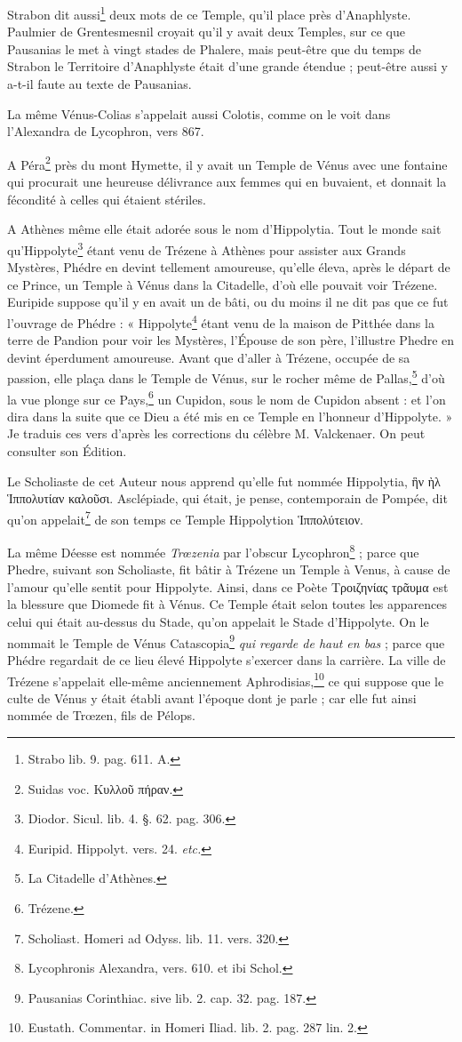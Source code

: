 \documentclass[a4paper, 11pt, oneside, polutonikogreek, french]{article}
\begin{document}
Strabon dit aussi\footnote{Strabo lib. 9. pag. 611. A.} deux mots de ce Temple, qu'il place près d'Anaphlyste. Paulmier de Grentesmesnil croyait qu'il y avait deux Temples, sur ce que Pausanias le met à vingt stades de Phalere, mais peut-être que du temps de Strabon le Territoire d'Anaphlyste était d'une grande étendue ; peut-être aussi y a-t-il faute au texte de Pausanias.

La même Vénus-Colias s'appelait aussi Colotis, comme on le voit dans l'Alexandra de Lycophron, vers 867.

A Péra\footnote{Suidas voc. Κυλλοῦ πήραν.} près du mont Hymette, il y avait un Temple de Vénus avec une fontaine qui procurait une heureuse délivrance aux femmes qui en buvaient, et donnait la fécondité à celles qui étaient stériles.

A Athènes même elle était adorée sous le nom d'Hippolytia. Tout le monde sait qu'Hippolyte\footnote{Diodor. Sicul. lib. 4. §. 62. pag. 306.} étant venu de Trézene à Athènes pour assister aux Grands Mystères, Phédre en devint tellement amoureuse, qu'elle éleva, après le départ de ce Prince, un Temple à Vénus dans la Citadelle, d'où elle pouvait voir Trézene. Euripide suppose qu'il y en avait un de bâti, ou du moins il ne dit pas que ce fut l'ouvrage de Phédre : « Hippolyte\footnote{Euripid. Hippolyt. vers. 24. \emph{etc.}} étant venu de la maison de Pitthée dans la terre de Pandion pour voir les Mystères, l'Épouse de son père, l'illustre Phedre en devint éperdument amoureuse. Avant que d'aller à Trézene, occupée de sa passion, elle plaça dans le Temple de Vénus, sur le rocher même de Pallas,\footnote{La Citadelle d'Athènes.} d'où la vue plonge sur ce Pays,\footnote{Trézene.} un Cupidon, sous le nom de Cupidon absent : et l'on dira dans la suite que ce Dieu a été mis en ce Temple en l'honneur d'Hippolyte. » Je traduis ces vers d'après les corrections du célèbre M. Valckenaer. On peut consulter son Édition.

Le Scholiaste de cet Auteur nous apprend qu'elle fut nommée Hippolytia, ἣν ὴλ Ἱππολυτίαν καλοῦσι. Asclépiade, qui était, je pense, contemporain de Pompée, dit qu'on appelait\footnote{Scholiast. Homeri ad Odyss. lib. 11. vers. 320.} de son temps ce Temple Hippolytion Ἱππολύτειον.

La même Déesse est nommée \emph{Trœzenia} par l'obscur Lycophron\footnote{Lycophronis Alexandra, vers. 610. et ibi Schol.} ; parce que Phedre, suivant son Scholiaste, fit bâtir à Trézene un Temple à Venus, à cause de l'amour qu'elle sentit pour Hippolyte. Ainsi, dans ce Poète Τροιζηνίας τρᾶυμα est la blessure que Diomede fit à Vénus. Ce Temple était selon toutes les apparences celui qui était au-dessus du Stade, qu'on appelait le Stade d'Hippolyte. On le nommait le Temple de Vénus Catascopia\footnote{Pausanias Corinthiac. sive lib. 2. cap. 32. pag. 187.} \emph{qui regarde de haut en bas} ; parce que Phédre regardait de ce lieu élevé Hippolyte s'exercer dans la carrière. La ville de Trézene s'appelait elle-même anciennement Aphrodisias,\footnote{Eustath. Commentar. in Homeri Iliad. lib. 2. pag. 287 lin. 2.} ce qui suppose que le culte de Vénus y était établi avant l'époque dont je parle ; car elle fut ainsi nommée de Trœzen, fils de Pélops.
\end{document}
